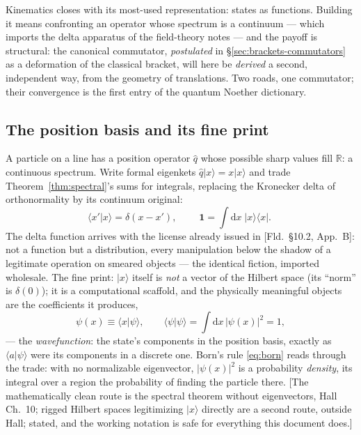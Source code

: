\documentclass[11pt]{article}
\theoremstyle{plain}
\theoremstyle{definition}
\theoremstyle{remark}
\newcommand{\dd}{\mathrm{d}}
\newcommand{\R}{\mathbb{R}}
\newcommand{\op}[1]{\hat{#1}}
\newcommand{\idop}{\mathbf{1}}  %
\newcommand{\ket}[1]{\lvert #1 \rangle}
\newcommand{\bra}[1]{\langle #1 \rvert}
\newcommand{\braket}[2]{\langle #1 | #2 \rangle}
\begin{document}
Kinematics closes with its most-used representation: states as
functions. Building it means confronting an operator whose spectrum
is a continuum --- which imports the delta
apparatus of the field-theory notes --- and the payoff is
structural: the canonical commutator, \emph{postulated} in
\S\ref{sec:brackets-commutators} as a deformation of the classical
bracket, will here be \emph{derived} a second, independent way, from
the geometry of translations. Two roads, one commutator; their
convergence is the first entry of the quantum Noether dictionary.

\subsection{The position basis and its fine print}
\label{sec:position-basis}

A particle on a line has a position operator $\op q$ whose possible
sharp values fill $\R$: a continuous spectrum. Write formal
eigenkets $\op q\ket x = x\ket x$ and trade
Theorem~\ref{thm:spectral}'s sums for integrals, replacing the
Kronecker delta of orthonormality by its continuum original:
\begin{equation}
  \braket{x'\!}{x} = \delta(x - x'),
  \qquad
  \boxed{\;
  \idop = \int \dd x\; \ket x\bra x .
  \;}
  \label{eq:position-completeness}
\end{equation}
The delta function arrives with the license already issued in
[Fld.\ \S10.2, App.~B]: not a function but a distribution, every
manipulation below the shadow of a legitimate operation on smeared
objects --- the identical fiction, imported wholesale. The fine
print: $\ket x$ itself is \emph{not} a vector of the Hilbert space
(its ``norm'' is $\delta(0)$); it is a computational scaffold, and
the physically meaningful objects are the coefficients it produces,
\begin{equation}
  \psi(x) \equiv \braket x\psi ,
  \qquad
  \braket\psi\psi = \int\dd x\,\bigl|\psi(x)\bigr|^2 = 1 ,
\end{equation}
--- the \emph{wavefunction}: the state's components in the position
basis, exactly as $\braket a\psi$ were its components in a discrete
one. Born's rule \eqref{eq:born} reads through the trade: with no
normalizable eigenvector, $|\psi(x)|^2$ is a probability
\emph{density}, its integral over a region the probability of
finding the particle there. [The mathematically clean route is the
spectral theorem without eigenvectors, Hall Ch.\ 10; rigged Hilbert
spaces legitimizing $\ket x$ directly are a second route, outside
Hall; stated, and the working
notation is safe for everything this document does.]
\end{document}
